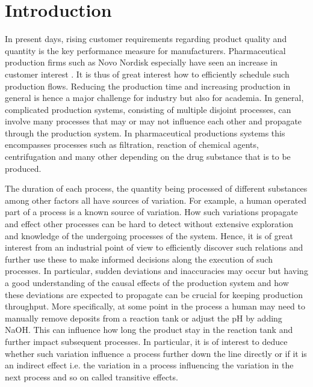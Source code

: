 \documentclass[../Thesis.tex]{subfiles}
\begin{document}
\chapter{Introduction}
In present days, rising customer requirements regarding product quality and quantity is the key performance measure for manufacturers. Pharmaceutical production firms such as Novo Nordisk especially have seen an increase in customer interest  \cite{NOVO_Wegovy_update}. It is thus of great interest how to efficiently schedule such production flows. Reducing the production time and increasing production in general is hence a major challenge for industry but also for academia. In general, complicated production systems, consisting of multiple disjoint processes, can involve many processes that may or may not influence each other and propagate through the production system. In pharmaceutical productions systems this encompasses processes such as filtration, reaction of chemical agents, centrifugation and many other depending on the drug substance that is to be produced.

The duration of each process, the quantity being processed of different substances among other factors all have sources of variation. For example, a human operated part of a process is a known source of variation. How such variations propagate and effect other processes can be hard to detect without extensive exploration and knowledge of the undergoing processes of the system. Hence, it is of great interest from an industrial point of view to efficiently discover such relations and further use these to make informed decisions along the execution of such processes. In particular, sudden deviations and inaccuracies may occur but having a good understanding of the causal effects of the production system and how these deviations are expected to propagate can be crucial for keeping production throughput. More specifically, at some point in the process a human may need to manually remove deposits from a reaction tank or adjust the pH by adding NaOH. This can influence how long the product stay in the reaction tank and further impact subsequent processes. In particular, it is of interest to deduce whether such variation influence a process further down the line directly or if it is an indirect effect i.e. the variation in a process influencing the variation in the next process and so on called transitive effects.
\end{document}
